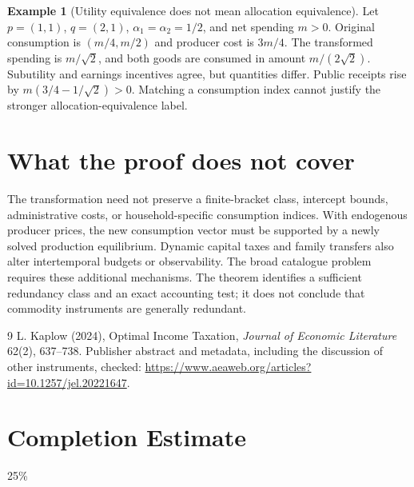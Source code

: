 \documentclass[11pt]{article}
\theoremstyle{definition}
\newtheorem{example}{Example}
\begin{document}
\begin{example}[Utility equivalence does not mean allocation equivalence]
Let $p=(1,1)$, $q=(2,1)$, $\alpha_1=\alpha_2=1/2$, and net spending $m>0$. Original consumption is $(m/4,m/2)$ and producer cost is $3m/4$. The transformed spending is $m/\sqrt2$, and both goods are consumed in amount $m/(2\sqrt2)$. Subutility and earnings incentives agree, but quantities differ. Public receipts rise by $m(3/4-1/\sqrt2)>0$. Matching a consumption index cannot justify the stronger allocation-equivalence label.
\end{example}

\section*{What the proof does not cover}
The transformation need not preserve a finite-bracket class, intercept bounds, administrative costs, or household-specific consumption indices. With endogenous producer prices, the new consumption vector must be supported by a newly solved production equilibrium. Dynamic capital taxes and family transfers also alter intertemporal budgets or observability. The broad catalogue problem requires these additional mechanisms. The theorem identifies a sufficient redundancy class and an exact accounting test; it does not conclude that commodity instruments are generally redundant.
\begin{thebibliography}{9}
 L. Kaplow (2024), Optimal Income Taxation, \emph{Journal of Economic Literature} 62(2), 637--738. Publisher abstract and metadata, including the discussion of other instruments, checked: \url{https://www.aeaweb.org/articles?id=10.1257/jel.20221647}.
\end{thebibliography}

\section{Completion Estimate}
25\%
\end{document}
